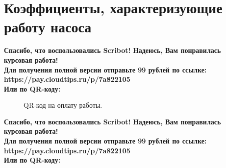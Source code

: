 \documentclass{article}
\begin{document}
\section{Коэффициенты, характеризующие работу насоса}
\begin{center}
    \textbf{
        Спасибо, что воспользовались Scribot! Надеюсь, Вам понравилась курсовая работа!\\
        Для получения полной версии отправьте 99 рублей по ссылке:\\
        https://pay.cloudtips.ru/p/7a822105\\
        Или по QR-коду:\\
    }
\end{center}
\begin{figure}[h]
    \caption{QR-код на оплату работы.}
    \label{ris:image}
\end{figure}
\newpage
\begin{center}
    \textbf{
        Спасибо, что воспользовались Scribot! Надеюсь, Вам понравилась курсовая работа!\\
        Для получения полной версии отправьте 99 рублей по ссылке:\\
        https://pay.cloudtips.ru/p/7a822105\\
        Или по QR-коду:\\
    }
\end{center}
\end{document}
